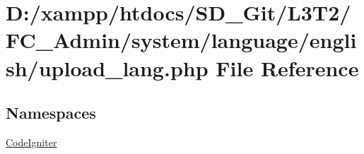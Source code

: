 \hypertarget{_admin_2system_2language_2english_2upload__lang_8php}{}\section{D\+:/xampp/htdocs/\+S\+D\+\_\+\+Git/\+L3\+T2/\+F\+C\+\_\+\+Admin/system/language/english/upload\+\_\+lang.php File Reference}
\label{_admin_2system_2language_2english_2upload__lang_8php}
\subsection*{Namespaces}
\begin{DoxyCompactItemize}
\item 
 \hyperlink{namespace_code_igniter}{Code\+Igniter}
\end{DoxyCompactItemize}
